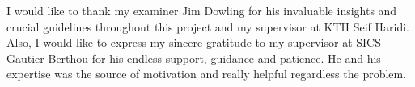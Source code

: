 I would like to thank my examiner Jim Dowling for his invaluable
insights and crucial guidelines throughout this project and my
supervisor at KTH Seif Haridi. Also, I would like to express my
sincere gratitude to my supervisor at SICS Gautier Berthou for his
endless support, guidance and patience. He and his expertise was
the source of motivation and really helpful regardless the problem.